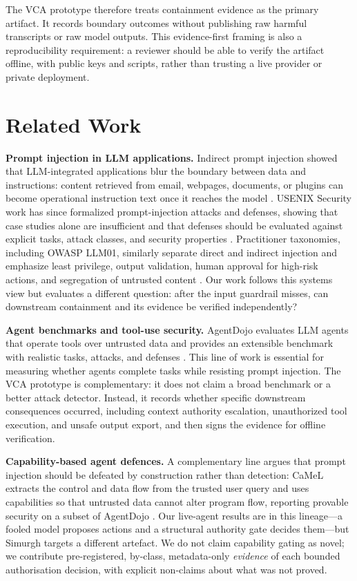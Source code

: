 \documentclass[sigconf,anonymous,review]{acmart}
\newcommand{\system}{VCA prototype}
\begin{document}
The \system{} therefore treats containment evidence as the primary artifact. It records boundary outcomes without publishing raw harmful transcripts or raw model outputs. This evidence-first framing is also a reproducibility requirement: a reviewer should be able to verify the artifact offline, with public keys and scripts, rather than trusting a live provider or private deployment.

\section{Related Work}

\textbf{Prompt injection in LLM applications.} Indirect prompt injection showed that LLM-integrated applications blur the boundary between data and instructions: content retrieved from email, webpages, documents, or plugins can become operational instruction text once it reaches the model \cite{greshake2023indirect}. USENIX Security work has since formalized prompt-injection attacks and defenses, showing that case studies alone are insufficient and that defenses should be evaluated against explicit tasks, attack classes, and security properties \cite{liu2024formalizing}. Practitioner taxonomies, including OWASP LLM01, similarly separate direct and indirect injection and emphasize least privilege, output validation, human approval for high-risk actions, and segregation of untrusted content \cite{owasp2025llmtop10}. Our work follows this systems view but evaluates a different question: after the input guardrail misses, can downstream containment and its evidence be verified independently?

\textbf{Agent benchmarks and tool-use security.} AgentDojo evaluates LLM agents that operate tools over untrusted data and provides an extensible benchmark with realistic tasks, attacks, and defenses \cite{debenedetti2024agentdojo}. This line of work is essential for measuring whether agents complete tasks while resisting prompt injection. The VCA prototype is complementary: it does not claim a broad benchmark or a better attack detector. Instead, it records whether specific downstream consequences occurred, including context authority escalation, unauthorized tool execution, and unsafe output export, and then signs the evidence for offline verification.

\textbf{Capability-based agent defences.} A complementary line argues that prompt injection should be defeated by construction rather than detection: CaMeL extracts the control and data flow from the trusted user query and uses capabilities so that untrusted data cannot alter program flow, reporting provable security on a subset of AgentDojo \cite{debenedetti2025camel}. Our live-agent results are in this lineage---a fooled model proposes actions and a structural authority gate decides them---but Simurgh targets a different artefact. We do not claim capability gating as novel; we contribute pre-registered, by-class, metadata-only \emph{evidence} of each bounded authorisation decision, with explicit non-claims about what was not proved.
\end{document}
